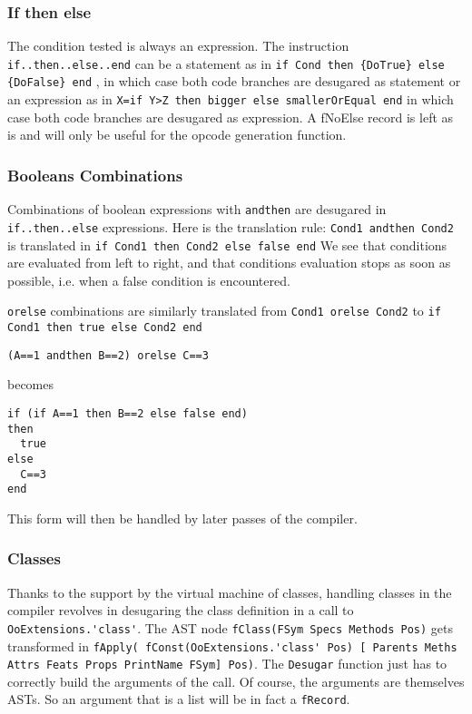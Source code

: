 \documentclass[a4paper]{memoir}
\begin{document}
\subsubsection{If then else}
The condition tested is always an expression.
The instruction \lstinline!if..then..else..end! can be a statement as in 
\lstinline!if Cond then {DoTrue} else {DoFalse} end!
, in which case both code branches are desugared as statement
or an expression as in
\lstinline!X=if Y>Z then bigger else smallerOrEqual end!
in which case both code branches are desugared as expression.
A fNoElse record is left as is and will only be useful for the opcode generation function.

\subsubsection{Booleans Combinations}
Combinations of boolean expressions with \lstinline!andthen! are desugared in
\lstinline!if..then..else! expressions. Here is the translation
rule:
\lstinline!Cond1 andthen Cond2! is translated in \lstinline!if Cond1 then Cond2 else false end! 
We see that conditions are evaluated from left to right, and that conditions
evaluation stops as soon as possible, i.e. when a false condition is
encountered.

\lstinline!orelse! combinations are similarly translated from \lstinline!Cond1 orelse Cond2! to \lstinline!if Cond1 then true else Cond2 end!  
\begin{lstlisting}
(A==1 andthen B==2) orelse C==3
\end{lstlisting}
becomes

\begin{lstlisting}
if (if A==1 then B==2 else false end)
then
  true
else
  C==3
end
\end{lstlisting}

This form will then be handled by later passes of the compiler.
\subsubsection{Classes}
Thanks to the support by the virtual machine of classes, handling classes in the
compiler revolves in desugaring the class definition in a call to
\lstinline!OoExtensions.'class'!. 
The AST node \lstinline!fClass(FSym Specs Methods Pos)! gets transformed in 
\lstinline!fApply( fConst(OoExtensions.'class' Pos) [ Parents Meths Attrs Feats Props PrintName FSym] Pos)!.
The \lstinline!Desugar! function just has to correctly build the arguments of
the call. Of course, the arguments are themselves ASTs. So an argument that is a
list will be in fact a \lstinline!fRecord!.
\end{document}
